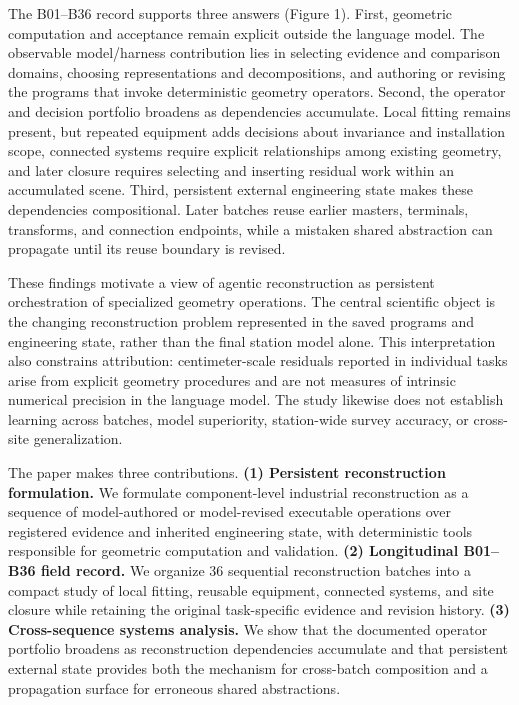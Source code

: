 \documentclass[10pt,a4paper]{article}
\begin{document}
The B01--B36 record supports three answers (Figure 1). First, geometric
computation and acceptance remain explicit outside the language model.
The observable model/harness contribution lies in selecting evidence and
comparison domains, choosing representations and decompositions, and
authoring or revising the programs that invoke deterministic geometry
operators. Second, the operator and decision portfolio broadens as
dependencies accumulate. Local fitting remains present, but repeated
equipment adds decisions about invariance and installation scope,
connected systems require explicit relationships among existing
geometry, and later closure requires selecting and inserting residual
work within an accumulated scene. Third, persistent external engineering
state makes these dependencies compositional. Later batches reuse
earlier masters, terminals, transforms, and connection endpoints, while
a mistaken shared abstraction can propagate until its reuse boundary is
revised.

These findings motivate a view of agentic reconstruction as persistent
orchestration of specialized geometry operations. The central scientific
object is the changing reconstruction problem represented in the saved
programs and engineering state, rather than the final station model
alone. This interpretation also constrains attribution: centimeter-scale
residuals reported in individual tasks arise from explicit geometry
procedures and are not measures of intrinsic numerical precision in the
language model. The study likewise does not establish learning across
batches, model superiority, station-wide survey accuracy, or cross-site
generalization.

The paper makes three contributions. \textbf{(1) Persistent
reconstruction formulation.} We formulate component-level industrial
reconstruction as a sequence of model-authored or model-revised
executable operations over registered evidence and inherited engineering
state, with deterministic tools responsible for geometric computation
and validation. \textbf{(2) Longitudinal B01--B36 field record.} We
organize 36 sequential reconstruction batches into a compact study of
local fitting, reusable equipment, connected systems, and site closure
while retaining the original task-specific evidence and revision
history. \textbf{(3) Cross-sequence systems analysis.} We show that the
documented operator portfolio broadens as reconstruction dependencies
accumulate and that persistent external state provides both the
mechanism for cross-batch composition and a propagation surface for
erroneous shared abstractions.
\end{document}
